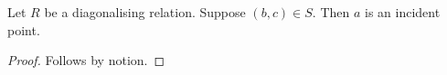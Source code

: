 

\begin{proposition}\label{reduced_missing}
    Let $R$ be a diagonalising relation.
    Suppose $(b,c)\in S$.
    Then $a$ is an incident point.
\end{proposition}
\begin{proof}
    Follows by notion.
\end{proof}
